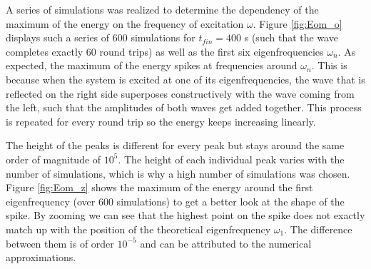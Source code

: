 \documentclass[a4paper,12pt,twoside]{article}
\begin{document}
    A series of simulations was realized to determine the dependency of the maximum of the energy on the frequency of excitation $\omega$. Figure \ref{fig:Eom_o} displays such a series of 600 simulations for $t_{fin}=400$ s (such that the wave completes exactly 60 round trips) as well as the first six eigenfrequencies $\omega_n$. As expected, the maximum of the energy spikes at frequencies around $\omega_n$. This is because when the system is excited at one of its eigenfrequencies, the wave that is reflected on the right side superposes constructively with the wave coming from the left, such that the amplitudes of both waves get added together. This process is repeated for every round trip so the energy keeps increasing linearly.

    The height of the peaks is different for every peak but stays around the same order of magnitude of $10^5$. The height of each individual peak varies with the number of simulations, which is why a high number of simulations was chosen. Figure \ref{fig:Eom_z} shows the maximum of the energy around the first eigenfrequency (over 600 simulations) to get a better look at the shape of the spike. By zooming we can see that the highest point on the spike does not exactly match up with the position of the theoretical eigenfrequency $\omega_1$. The difference between them is of order $10^{-5}$ and can be attributed to the numerical approximations.
\end{document}
